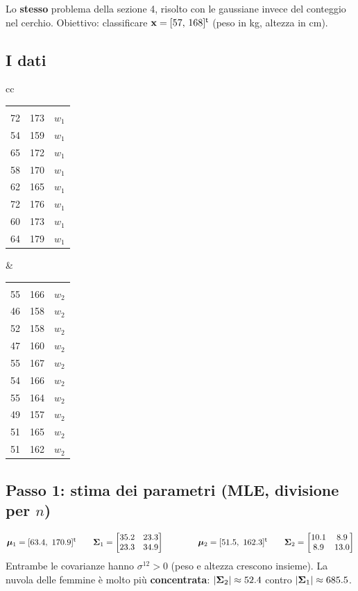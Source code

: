
Lo \textbf{stesso} problema della sezione 4, risolto con le gaussiane invece del conteggio nel cerchio. Obiettivo: classificare $\mathbf{x}=[57,\,168]^{\mathsf{t}}$ (peso in kg, altezza in cm).

\subsection{I dati}
\begin{center}\small
\begin{tabular}{cc}
\begin{tabular}{ccc}
\rowcolor{blu}\thd{Peso} & \thd{Altezza} & \thd{Classe}\\
\rowcolor{white}72&173&$w_1$\\ \rowcolor{blu!8}54&159&$w_1$\\ 65&172&$w_1$\\ \rowcolor{blu!8}58&170&$w_1$\\
62&165&$w_1$\\ \rowcolor{blu!8}72&176&$w_1$\\ 60&173&$w_1$\\ \rowcolor{blu!8}64&179&$w_1$\\
\end{tabular}
&
\begin{tabular}{ccc}
\rowcolor{rosso}\thd{Peso} & \thd{Altezza} & \thd{Classe}\\
\rowcolor{white}55&166&$w_2$\\ \rowcolor{rosso!8}46&158&$w_2$\\ 52&158&$w_2$\\ \rowcolor{rosso!8}47&160&$w_2$\\
55&167&$w_2$\\ \rowcolor{rosso!8}54&166&$w_2$\\ 55&164&$w_2$\\ \rowcolor{rosso!8}49&157&$w_2$\\
51&165&$w_2$\\ \rowcolor{rosso!8}51&162&$w_2$\\
\end{tabular}
\end{tabular}
\end{center}

\subsection{Passo 1: stima dei parametri (MLE, divisione per $n$)}
\begin{esempio}
\[
\bm{\mu}_1=[63.4,\ 170.9]^{\mathsf{t}}\qquad \bm{\Sigma}_1=\begin{bmatrix}35.2&23.3\\23.3&34.9\end{bmatrix}
\qquad\qquad
\bm{\mu}_2=[51.5,\ 162.3]^{\mathsf{t}}\qquad \bm{\Sigma}_2=\begin{bmatrix}10.1&8.9\\8.9&13.0\end{bmatrix}
\]
Entrambe le covarianze hanno $\sigma^{12}>0$ (peso e altezza crescono insieme). La nuvola delle femmine è molto più \textbf{concentrata}: $|\bm{\Sigma}_2|\approx52.4$ contro $|\bm{\Sigma}_1|\approx685.5$.
\end{esempio}

